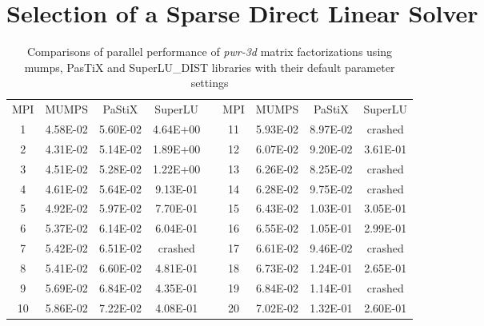 \chapter{Selection of a Sparse Direct Linear Solver}
\label{app:app-lc}

\newpage


\begin{table}[!t]
\centering
\begin{tabular}{|c|c|c|c|l|c|c|c|c|}
\cline{1-4} \cline{6-9}
MPI & MUMPS    & PaStiX   & SuperLU  &  & MPI & MUMPS    & PaStiX   & SuperLU  \\ \cline{1-4} \cline{6-9} 
1   & 4.58E-02 & 5.60E-02 & 4.64E+00 &  & 11  & 5.93E-02 & 8.97E-02 & crashed  \\ \cline{1-4} \cline{6-9} 
2   & 4.31E-02 & 5.14E-02 & 1.89E+00 &  & 12  & 6.07E-02 & 9.20E-02 & 3.61E-01 \\ \cline{1-4} \cline{6-9} 
3   & 4.51E-02 & 5.28E-02 & 1.22E+00 &  & 13  & 6.26E-02 & 8.25E-02 & crashed  \\ \cline{1-4} \cline{6-9} 
4   & 4.61E-02 & 5.64E-02 & 9.13E-01 &  & 14  & 6.28E-02 & 9.75E-02 & crashed  \\ \cline{1-4} \cline{6-9} 
5   & 4.92E-02 & 5.97E-02 & 7.70E-01 &  & 15  & 6.43E-02 & 1.03E-01 & 3.05E-01 \\ \cline{1-4} \cline{6-9} 
6   & 5.37E-02 & 6.14E-02 & 6.04E-01 &  & 16  & 6.55E-02 & 1.05E-01 & 2.99E-01 \\ \cline{1-4} \cline{6-9} 
7   & 5.42E-02 & 6.51E-02 & crashed  &  & 17  & 6.61E-02 & 9.46E-02 & crashed  \\ \cline{1-4} \cline{6-9} 
8   & 5.41E-02 & 6.60E-02 & 4.81E-01 &  & 18  & 6.73E-02 & 1.24E-01 & 2.65E-01 \\ \cline{1-4} \cline{6-9} 
9   & 5.69E-02 & 6.84E-02 & 4.35E-01 &  & 19  & 6.84E-02 & 1.14E-01 & crashed  \\ \cline{1-4} \cline{6-9} 
10  & 5.86E-02 & 7.22E-02 & 4.08E-01 &  & 20  & 7.02E-02 & 1.32E-01 & 2.60E-01 \\ \cline{1-4} \cline{6-9} 
\end{tabular}
\caption{Comparisons of parallel performance of  \textit{pwr-3d} matrix factorizations using \acrshort{mumps}, PasTiX and SuperLU\_DIST libraries with their default parameter settings}
\label{table:app-lc-pwr-3d-result}
\end{table}

